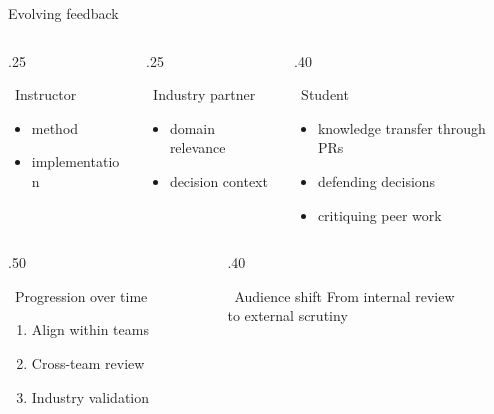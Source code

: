 \begin{frame}{Evolving feedback}

\begin{columns}[T,onlytextwidth]
\begin{column}{.25\textwidth}
\begin{block}{\normalsize\faChalkboardUser~Instructor}
\begin{itemize} \small
    \item method
    \item implementation
\end{itemize}
\end{block}
\end{column}
\begin{column}{.25\textwidth}
\begin{block}{\normalsize\faIndustry~Industry partner}
\begin{itemize} \small
    \item domain relevance
    \item decision context
\end{itemize}
\end{block}
\end{column}
\begin{column}{.40\textwidth}
\begin{block}{\normalsize\faUser~Student}
\begin{itemize} \small
    \item knowledge transfer through PRs
    \item defending decisions
    \item critiquing peer work
\end{itemize}
\end{block}
\end{column}
\end{columns}

\begin{columns}[onlytextwidth]
\begin{column}{.50\textwidth}
\begin{exampleblock}{\faClock~Progression over time}
\begin{enumerate}
    \item Align within teams
    \item Cross-team review 
    \item Industry validation
\end{enumerate}
\end{exampleblock}
\end{column}
\begin{column}{.40\textwidth}    
\begin{alertblock}{\faNetworkWired~Audience shift}
\centering
From internal review\\
to external scrutiny
\end{alertblock}
\end{column}

\end{columns}

\end{frame}
